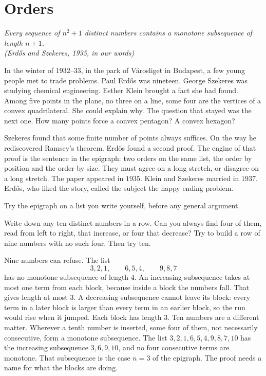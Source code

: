 \chapter{Orders}\label{ch:orders}

\begin{center}\itshape
Every sequence of $n^2+1$ distinct numbers contains a monotone subsequence of length $n+1$.\\
\upshape(Erd\H os and Szekeres, 1935, in our words)
\end{center}

In the winter of $1932$--$33$, in the park of V\'arosliget in Budapest, a few young people met to trade problems. Paul Erd\H os was nineteen. George Szekeres was studying chemical engineering. Esther Klein brought a fact she had found. Among five points in the plane, no three on a line, some four are the vertices of a convex quadrilateral. She could explain why. The question that stayed was the next one. How many points force a convex pentagon? A convex hexagon?

Szekeres found that some finite number of points always suffices. On the way he rediscovered Ramsey's theorem. Erd\H os found a second proof. The engine of that proof is the sentence in the epigraph: two orders on the same list, the order by position and the order by size. They must agree on a long stretch, or disagree on a long stretch. The paper appeared in $1935$. Klein and Szekeres married in $1937$. Erd\H os, who liked the story, called the subject the happy ending problem.


Try the epigraph on a list you write yourself, before any general argument.

\begin{think}
Write down any ten distinct numbers in a row. Can you always find four of them, read from left to right, that increase, or four that decrease? Try to build a row of nine numbers with no such four. Then try ten.
\end{think}

Nine numbers can refuse. The list
\[
3,2,1,\qquad 6,5,4,\qquad 9,8,7
\]
has no monotone subsequence of length $4$. An increasing subsequence takes at most one term from each block, because inside a block the numbers fall. That gives length at most $3$. A decreasing subsequence cannot leave its block: every term in a later block is larger than every term in an earlier block, so the run would rise when it jumped. Each block has length $3$. Ten numbers are a different matter. Wherever a tenth number is inserted, some four of them, not necessarily consecutive, form a monotone subsequence. The list $3,2,1,6,5,4,9,8,7,10$ has the increasing subsequence $3,6,9,10$, and no four consecutive terms are monotone. That subsequence is the case $n=3$ of the epigraph. The proof needs a name for what the blocks are doing.

